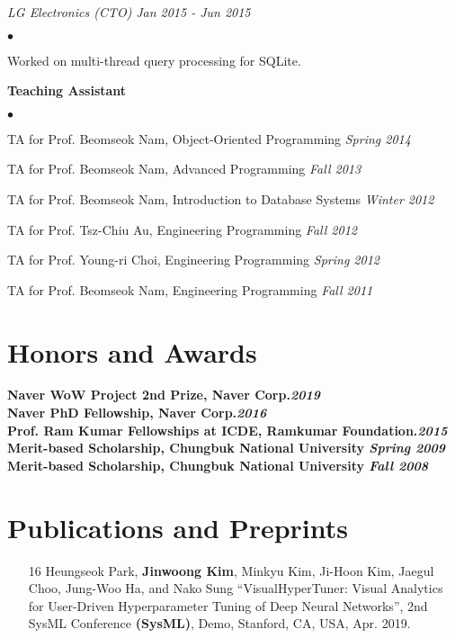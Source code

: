 \documentclass[margin,line]{res}
\newenvironment{list2}{
  \begin{list}{$\bullet$}{%
      \setlength{\itemsep}{0in}
      \setlength{\parsep}{0in} \setlength{\parskip}{0in}
      \setlength{\topsep}{0in} \setlength{\partopsep}{0in}
      \setlength{\leftmargin}{0.2in}}}{\end{list}}
\begin{document}
\begin{resume}
{\it LG Electronics (CTO)} \hfill  {\it Jan 2015 - Jun 2015}\\
\begin{list2}
\item Worked on multi-thread query processing for SQLite.
\end{list2}

{\bf Teaching Assistant} \\
\vspace{-.1in}
\begin{list2}
\item {TA for Prof. Beomseok Nam, Object-Oriented Programming } \hfill {\it Spring 2014}
\item {TA for Prof. Beomseok Nam, Advanced Programming } \hfill {\it Fall 2013}
\item {TA for Prof. Beomseok Nam, Introduction to Database Systems } \hfill{\it Winter 2012}
\item {TA for Prof. Tsz-Chiu Au, Engineering Programming } \hfill {\it Fall 2012}
\item {TA for Prof. Young-ri Choi, Engineering Programming } \hfill {\it Spring 2012}
\item {TA for Prof. Beomseok Nam, Engineering Programming } \hfill {\it Fall 2011}
\end{list2}

\section{\sc Honors and Awards}

{\bf Naver WoW Project 2nd Prize, Naver Corp.\hfill {\it 2019} \\
{\bf Naver PhD Fellowship}, Naver Corp.\hfill {\it 2016} \\
{\bf Prof. Ram Kumar Fellowships at ICDE}, Ramkumar Foundation.\hfill {\it 2015} \\
{\bf Merit-based Scholarship}, Chungbuk National University \hfill {\it Spring 2009} \\
{\bf Merit-based Scholarship}, Chungbuk National University \hfill {\it Fall 2008} 

\section{\sc Publications and Preprints}

\begin{enumerate}

\item[16] Heungseok Park, {\bf Jinwoong Kim}, Minkyu Kim, Ji-Hoon Kim, Jaegul Choo,
Jung-Woo Ha, and Nako Sung ``VisualHyperTuner: Visual Analytics for User-Driven
Hyperparameter Tuning of Deep Neural Networks'', 2nd SysML Conference {\bf
(SysML)}, Demo, Stanford, CA, USA, Apr. 2019.


\end{enumerate}}
\end{resume}
\end{document}
